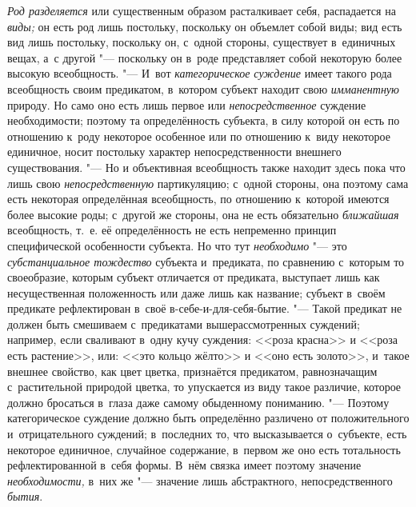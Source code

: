 {\em Род разделяется} или существенным образом расталкивает себя,
распадается на {\em виды;} он есть род
лишь постольку, поскольку он объемлет собой виды; вид есть вид лишь
постольку, поскольку он, с~одной стороны, существует в~единичных вещах, а~с
другой "--- поскольку он в~роде представляет собой некоторую
более высокую всеобщность. "--- И~вот {\em категорическое суждение}
имеет такого рода всеобщность своим предикатом, в~котором
субъект находит свою {\em имманентную}
природу. Но само оно есть лишь первое или {\em непосредственное}
суждение необходимости; поэтому та определённость субъекта, в
силу которой он есть по отношению к~роду некоторое особенное или по
отношению к~виду некоторое единичное, носит постольку характер
непосредственности внешнего существования. "--- Но и
объективная всеобщность также находит здесь пока что лишь
свою {\em непосредственную}
партикуляцию; с~одной стороны, она поэтому сама есть
некоторая определённая всеобщность, по отношению к~которой имеются более
высокие роды; с~другой же стороны, она не есть обязательно {\em ближайшая}
всеобщность, т.~е. её определённость не есть непременно
принцип специфической особенности субъекта. Но что тут
{\em необходимо} "--- это {\em субстанциальное тождество}
субъекта и~предиката, по сравнению с~которым то своеобразие,
которым субъект отличается от предиката, выступает лишь как несущественная
положенность или даже лишь как название; субъект в~своём предикате
рефлектирован в~своё в-себе-и-для-себя-бытие. "--- Такой
предикат не должен быть смешиваем с~предикатами вышерассмотренных суждений;
например, если сваливают в~одну кучу суждения: <<роза красна>> и
<<роза есть растение>>, или: <<это кольцо жёлто>> и <<оно есть золото>>,
и~такое внешнее свойство, как цвет цветка, признаётся
предикатом, равнозначащим с~растительной природой цветка, то упускается из
виду такое различие, которое должно бросаться в~глаза даже самому
обыденному пониманию. "--- Поэтому категорическое суждение
должно быть определённо различено от положительного и~отрицательного
суждений; в~последних то, что высказывается о~субъекте, есть некоторое
единичное, случайное содержание, в~первом же оно есть тотальность
рефлектированной в~себя формы. В~нём связка имеет поэтому значение
{\em необходимости,} в~них же "--- значение лишь абстрактного,
непосредственного {\em бытия}.

